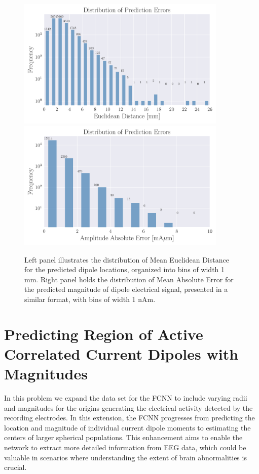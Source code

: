 \documentclass[a4paper, UKenglish, 11pt]{uiomaster}
\begin{document}
\begin{figure}
  \includegraphics[width=10cm]{figures/new_histogram_position_amplitude.pdf}
  \includegraphics[width=10cm]{figures/new_histogram_amplitude_amplitude.pdf}
  \caption{Left panel illustrates the distribution of Mean Euclidean Distance for the predicted dipole locations, organized into bins of width 1 mm. Right panel holds the distribution of Mean Absolute Error for the predicted magnitude of dipole electrical signal, presented in a similar format, with bins of width 1 nAm.}
  \label{fig:histogram_magnitude}
\end{figure}



\section{Predicting Region of Active Correlated Current Dipoles with Magnitudes} \label{sec:result_area}

In this problem we expand the data set for the FCNN to include varying radii and magnitudes for the origins generating the electrical activity detected by the recording electrodes. In this extension, the FCNN progresses from predicting the location and magnitude of individual current dipole moments to estimating the centers of larger spherical populations. This enhancement aims to enable the network to extract more detailed information from EEG data, which could be valuable in scenarios where understanding the extent of brain abnormalities is crucial.
\end{document}
